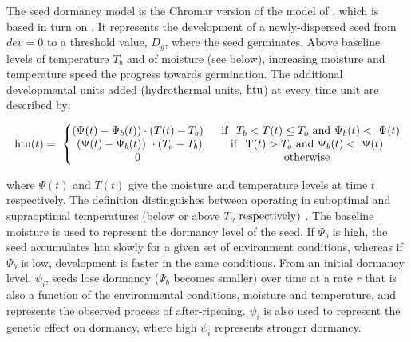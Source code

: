 The seed dormancy model is the Chromar version of the model of
\citet{burghardt_modeling_2015}, which is based in turn on
\citet{alvarado_hydrothermal_2002}. It represents the development of a
newly-dispersed seed from \(dev = 0\) to a threshold value, \(D_{g}\), where the
seed germinates. Above baseline levels of temperature $T_b$ and of moisture (see
below), increasing moisture and temperature speed the progress towards
germination. The additional developmental units added (hydrothermal units,
\(\mathrm{htu}\)) at every time unit are described by:

\[\mathrm{htu}( t ) = \ \left\{ \begin{matrix}
( \Psi( t ) - \Psi_{b}( t ) ) \cdot ( T( t ) - T_{b} ) \\
\ ( \Psi( t ) - \Psi_{b}( t ) )\  \cdot ( T_{o} - T_{b} ) \\
0 \\
\end{matrix} \right.\ \ \begin{matrix}
\mathrm{\ \ if\ \ }T_{b} < T( t ) \leq T_{o}\ \mathrm{and}\ \Psi_{b}( t ) < \ \Psi(t) \\
\mathrm{if\ \ T}( t ) > T_{o}\ \mathrm{and}\ \Psi_{b}( t ) < \ \Psi( t ) \\
\mathrm{otherwise} \\
\end{matrix}\]

where \(\Psi(t)\) and \(T(t)\) give the moisture and temperature levels
at time \(t\) respectively. The definition distinguishes between
operating in suboptimal and supraoptimal temperatures (below or above
\(T_{o}\ \mathrm{respectively})\ \). The baseline moisture is used to
represent the dormancy level of the seed. If \(\Psi_{b}\) is high, the
seed accumulates htu slowly for a given set of environment conditions,
whereas if \(\Psi_{b}\) is low, development is faster in the same
conditions. From an initial dormancy level, \(\psi_{i}\), seeds lose
dormancy (\(\Psi_{b}\) becomes smaller) over time at a rate $r$
that is also a function of the environmental conditions, moisture and
temperature, and represents the observed process of after-ripening.
\(\psi_{i}\) is also used to represent the genetic effect on dormancy,
where high \(\psi_{i}\) represents stronger dormancy.

